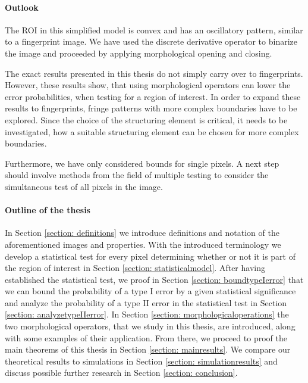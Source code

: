 \documentclass[a4paper,12pt]{article}
\theoremstyle{plain}
\theoremstyle{definition}
\numberwithin{equation}{section}
\begin{document}
\paragraph{Outlook}

The ROI in this simplified model is convex and has an oscillatory pattern, similar to a fingerprint image. We have used the discrete derivative operator to binarize the image and proceeded by applying morphological opening and closing.

The exact results presented in this thesis do not simply carry over to fingerprints. However, these results show, that using morphological operators can lower the error probabilities, when testing for a region of interest. In order to expand these results to fingerprints, fringe patterns with more complex boundaries have to be explored. Since the choice of the structuring element is critical, it needs to be investigated, how a suitable structuring element can be chosen for more complex boundaries.

Furthermore, we have only considered bounds for single pixels. A next step should involve methods from the field of multiple testing to consider the simultaneous test of all pixels in the image.

\paragraph{Outline of the thesis}

In Section \ref{section: definitions} we introduce definitions and notation of the aforementioned images and properties. With the introduced terminology we develop a statistical test for every pixel determining whether or not it is part of the region of interest in Section \ref{section: statisticalmodel}. After having established the statistical test, we proof in Section \ref{section: boundtypeIerror} that we can bound the probability of a type I error by a given statistical significance and analyze the probability of a type II error in the statistical test in Section \ref{section: analyzetypeIIerror}. In Section \ref{section: morphologicaloperations} the two morphological operators, that we study in this thesis, are introduced, along with some examples of their application. From there, we proceed to proof the main theorems of this thesis in Section \ref{section: mainresults}. We compare our theoretical results to simulations in Section \ref{section: simulationresults} and discuss possible further research in Section \ref{section: conclusion}.
\end{document}
